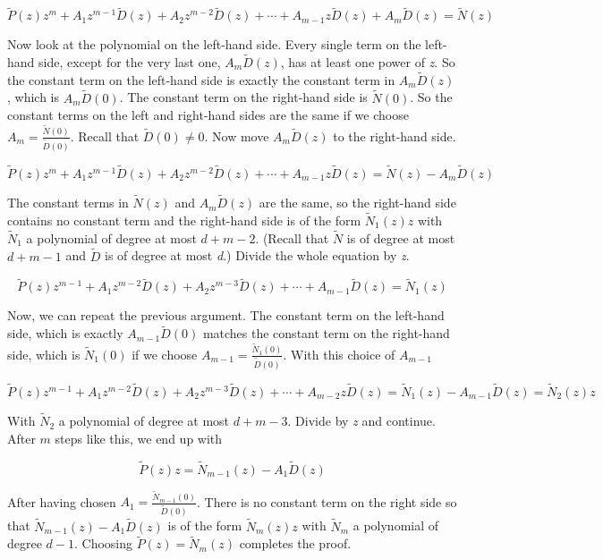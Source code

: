 \[
    \tilde{P}(z)z^m + A_1 z^{m-1} \tilde{D}(z) + A_2 z^{m-2} \tilde{D}(z) + \cdots + A_{m-1} z 
    \tilde{D}(z) + A_m \tilde{D}(z) = \tilde{N}(z)
\]

Now look at the polynomial on the left-hand side. Every single term on the left-hand side,
except for the very last one, \(A_m \tilde{D}(z)\), has at least one power of \emph{z}. So the constant 
term on the left-hand side is exactly the constant term in \(A_m \tilde{D}(z)\), which is 
\(A_m \tilde{D}(0)\). The constant term on the right-hand side is \(\tilde{N}(0)\). So the constant terms 
on the left and right-hand sides are the same if we choose \(A_m = \frac{\tilde{N}(0)}{\tilde{D}(0)}\). 
Recall that \(\tilde{D}(0) \neq 0\). Now move \(A_m \tilde{D}(z)\) to the right-hand side.

\[
    \tilde{P}(z)z^m + A_1 z^{m-1} \tilde{D}(z) + A_2 z^{m-2} \tilde{D}(z) + \cdots + A_{m-1} z 
    \tilde{D}(z) = \tilde{N}(z) - A_m \tilde{D}(z)
\]

The constant terms in \(\tilde{N}(z)\) and \(A_m \tilde{D}(z)\) are the same, so the right-hand side 
contains no constant term and the right-hand side is of the form \(\tilde{N}_1(z)z\) with \(\tilde{N}_1\) 
a polynomial of degree at most \(d + m - 2\). (Recall that \(\tilde{N}\) is of degree at most 
\(d + m - 1\) and \(\tilde{D}\) is of degree at most \emph{d}.) Divide the whole equation by \emph{z}.

\[
    \tilde{P}(z)z^{m-1} + A_1 z^{m-2} \tilde{D}(z) + A_2 z^{m-3} \tilde{D}(z) + \cdots + A_{m-1} 
    \tilde{D}(z) = \tilde{N}_1(z)
\]

Now, we can repeat the previous argument. The constant term on the left-hand side, which
is exactly \(A_{m-1} \tilde{D}(0)\) matches the constant term on the right-hand side, which is 
\(\tilde{N}_1(0)\) if we choose \(A_{m-1} = \frac{\tilde{N}_1(0)}{\tilde{D}(0)}\). With this choice of 
\(A_{m-1}\)

\[
    \tilde{P}(z)z^{m-1} + A_1 z^{m-2} \tilde{D}(z) + A_2 z^{m-3} \tilde{D}(z) + \cdots + A_{m-2} z 
    \tilde{D}(z) = \tilde{N}_1(z) - A_{m-1} \tilde{D}(z) = \tilde{N}_2(z)z
\]

With \(\tilde{N}_2\) a polynomial of degree at most \(d + m - 3\). Divide by \emph{z} and continue. 
After \(m\) steps like this, we end up with

\[
    \tilde{P}(z)z = \tilde{N}_{m-1}(z) - A_1 \tilde{D}(z)
\]

After having chosen \(A_1 = \frac{\tilde{N}_{m-1}(0)}{\tilde{D}(0)}\). There is no constant term on the 
right side so that \(\tilde{N}_{m-1}(z) - A_1 \tilde{D}(z)\) is of the form \(\tilde{N}_m(z)z\) with 
\(\tilde{N}_m\) a polynomial of degree \(d - 1\). Choosing \(\tilde{P}(z) = \tilde{N}_m(z)\) completes 
the proof.


